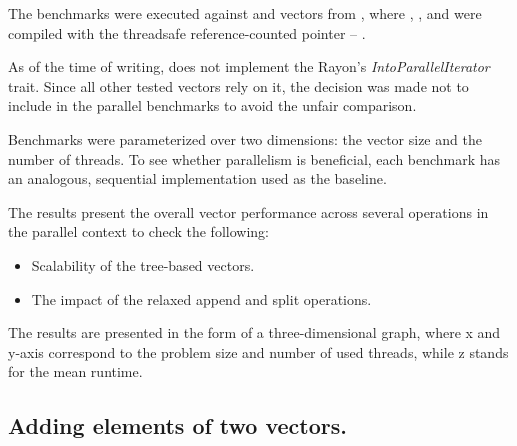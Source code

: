 The benchmarks were executed against \stdvec{} and vectors from \pvecrs{}, where \rbvec{}, \rrbvec{}, and \pvec{} were compiled with the threadsafe reference-counted pointer -- \arc{}.

As of the time of writing, \imrsvec{} does not implement the Rayon's \emph{IntoParallelIterator} trait. Since all other tested vectors rely on it, the decision was made not to include \imrsvec{} in the parallel benchmarks to avoid the unfair comparison.

Benchmarks were parameterized over two dimensions: the vector size and the number of threads. To see whether parallelism is beneficial, each benchmark has an analogous, sequential implementation used as the baseline.

The results present the overall vector performance across several operations in the parallel context to check the following:
\begin{itemize}
    \item Scalability of the tree-based vectors.
    \item The impact of the relaxed append and split operations.
\end{itemize}

The results are presented in the form of a three-dimensional graph, where x and y-axis correspond to the problem size and number of used threads, while z stands for the mean runtime.

\subsection{Adding elements of two vectors.}

